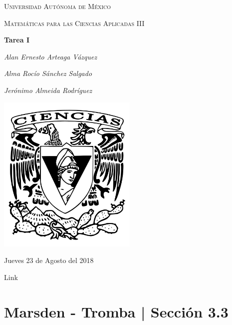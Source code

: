 \documentclass[a4paper,12pt]{article}
\begin{document}
\newcommand{\osf}[2]{\dfrac{#1^2}{#2^2}}
\newcommand{\T}{\Big(2\pi\cdot\sqrt{\dfrac{l}{g}}\Big)}
\newcommand{\alpa}{\dfrac{e^{x \beta -3}{2y\beta +5}}}
\newcommand{\deriv}[2]{\dfrac{\delta #1}{\delta #2}}
\newcommand{\sderiv}[3]{\dfrac{\delta ^2 #1}{\delta #2 \delta #3}}
\newcommand{\ext}{e^{ax-bt}}
\newcommand{\exy}{e^{((x-1)^2 + (y-3)^2}}
\newcommand{\xo}{\vec{x_0}} %
\providecommand{\norm}[1]{\parallel #1\parallel}

\begin{titlepage}
	\centering
	{\scshape\LARGE Universidad Autónoma de México \par}
	\vspace{1cm}
	{\scshape\Large Matemáticas para las Ciencias Aplicadas III\par}
	\vspace{1.5cm}
	{\huge\bfseries Tarea I\par}
	\vspace{.5cm}
	{\Large\itshape Alan Ernesto Arteaga Vázquez \par}
    \vspace{.5cm}
	{\Large\itshape Alma Rocío Sánchez Salgado \par}
    \vspace{.5cm}
	{\Large\itshape Jerónimo Almeida Rodríguez \par}
	\vfill
	 \includegraphics[width=0.5\textwidth]{../escudo_f-ciencias.png}
	\vfill

	{\large Jueves 23 de Agosto del 2018 \par}
\end{titlepage}

\newpage
Link
\section{Marsden - Tromba | Sección 3.3}
\end{document}
